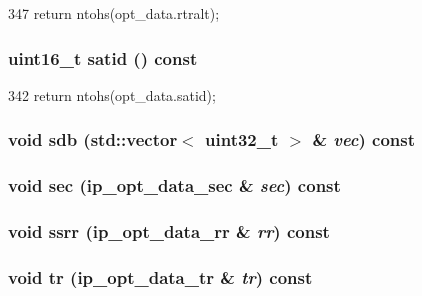\begin{DoxyCode}
347 { return ntohs(opt_data.rtralt); }
\end{DoxyCode}
\hypertarget{structNet_1_1IpOpt_ae28ba2d1127ea1914b0e5f42376b47e1}{
\subsubsection[{satid}]{\setlength{\rightskip}{0pt plus 5cm}uint16\_\-t satid () const}}
\label{structNet_1_1IpOpt_ae28ba2d1127ea1914b0e5f42376b47e1}



\begin{DoxyCode}
342 { return ntohs(opt_data.satid); }
\end{DoxyCode}
\hypertarget{structNet_1_1IpOpt_acb263b631e7b25b777b2300a459dde33}{
\subsubsection[{sdb}]{\setlength{\rightskip}{0pt plus 5cm}void sdb ({\bf std::vector}$<$ {\bf uint32\_\-t} $>$ \& {\em vec}) const}}
\label{structNet_1_1IpOpt_acb263b631e7b25b777b2300a459dde33}
\hypertarget{structNet_1_1IpOpt_afe3a37791e9a20e6780aa9a1aec92a2c}{
\subsubsection[{sec}]{\setlength{\rightskip}{0pt plus 5cm}void sec (ip\_\-opt\_\-data\_\-sec \& {\em sec}) const}}
\label{structNet_1_1IpOpt_afe3a37791e9a20e6780aa9a1aec92a2c}
\hypertarget{structNet_1_1IpOpt_a97784b42fb7ffd38b1bd1ffe8b222002}{
\subsubsection[{ssrr}]{\setlength{\rightskip}{0pt plus 5cm}void ssrr (ip\_\-opt\_\-data\_\-rr \& {\em rr}) const}}
\label{structNet_1_1IpOpt_a97784b42fb7ffd38b1bd1ffe8b222002}
\hypertarget{structNet_1_1IpOpt_ace178303b38d98788c16c141f3b55971}{
\subsubsection[{tr}]{\setlength{\rightskip}{0pt plus 5cm}void tr (ip\_\-opt\_\-data\_\-tr \& {\em tr}) const}}
